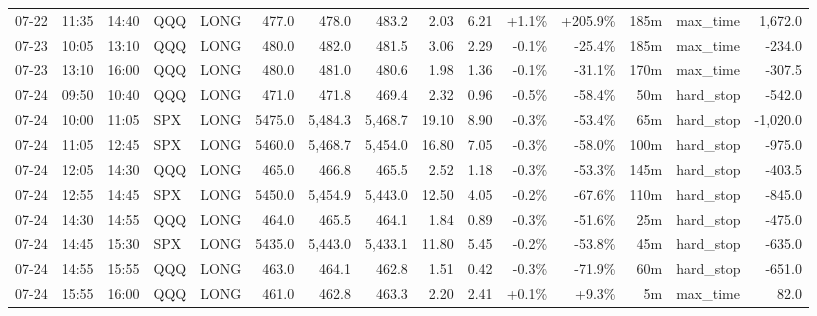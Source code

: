 \documentclass[11pt,a4paper,twoside]{article}
\begin{document}
\begin{landscape}
\begin{center}
\begin{longtable}{>{\color{txtmain}}l l l l l r r r r r r r r >{\color{txtmain}}l r}
07-22 & 11:35 & 14:40 & QQQ & LONG & 477.0 & 478.0 & 483.2 & 2.03 & 6.21 & \textcolor{wingreen}{+1.1\%} & \textcolor{wingreen}{+205.9\%} & 185m & max\_time & \textcolor{wingreen}{1,672.0} \\
07-23 & 10:05 & 13:10 & QQQ & LONG & 480.0 & 482.0 & 481.5 & 3.06 & 2.29 & \textcolor{lossred}{-0.1\%} & \textcolor{lossred}{-25.4\%} & 185m & max\_time & \textcolor{lossred}{-234.0} \\
07-23 & 13:10 & 16:00 & QQQ & LONG & 480.0 & 481.0 & 480.6 & 1.98 & 1.36 & \textcolor{lossred}{-0.1\%} & \textcolor{lossred}{-31.1\%} & 170m & max\_time & \textcolor{lossred}{-307.5} \\
07-24 & 09:50 & 10:40 & QQQ & LONG & 471.0 & 471.8 & 469.4 & 2.32 & 0.96 & \textcolor{lossred}{-0.5\%} & \textcolor{lossred}{-58.4\%} & 50m & hard\_stop & \textcolor{lossred}{-542.0} \\
07-24 & 10:00 & 11:05 & SPX & LONG & 5475.0 & 5,484.3 & 5,468.7 & 19.10 & 8.90 & \textcolor{lossred}{-0.3\%} & \textcolor{lossred}{-53.4\%} & 65m & hard\_stop & \textcolor{lossred}{-1,020.0} \\
07-24 & 11:05 & 12:45 & SPX & LONG & 5460.0 & 5,468.7 & 5,454.0 & 16.80 & 7.05 & \textcolor{lossred}{-0.3\%} & \textcolor{lossred}{-58.0\%} & 100m & hard\_stop & \textcolor{lossred}{-975.0} \\
07-24 & 12:05 & 14:30 & QQQ & LONG & 465.0 & 466.8 & 465.5 & 2.52 & 1.18 & \textcolor{lossred}{-0.3\%} & \textcolor{lossred}{-53.3\%} & 145m & hard\_stop & \textcolor{lossred}{-403.5} \\
07-24 & 12:55 & 14:45 & SPX & LONG & 5450.0 & 5,454.9 & 5,443.0 & 12.50 & 4.05 & \textcolor{lossred}{-0.2\%} & \textcolor{lossred}{-67.6\%} & 110m & hard\_stop & \textcolor{lossred}{-845.0} \\
07-24 & 14:30 & 14:55 & QQQ & LONG & 464.0 & 465.5 & 464.1 & 1.84 & 0.89 & \textcolor{lossred}{-0.3\%} & \textcolor{lossred}{-51.6\%} & 25m & hard\_stop & \textcolor{lossred}{-475.0} \\
07-24 & 14:45 & 15:30 & SPX & LONG & 5435.0 & 5,443.0 & 5,433.1 & 11.80 & 5.45 & \textcolor{lossred}{-0.2\%} & \textcolor{lossred}{-53.8\%} & 45m & hard\_stop & \textcolor{lossred}{-635.0} \\
07-24 & 14:55 & 15:55 & QQQ & LONG & 463.0 & 464.1 & 462.8 & 1.51 & 0.42 & \textcolor{lossred}{-0.3\%} & \textcolor{lossred}{-71.9\%} & 60m & hard\_stop & \textcolor{lossred}{-651.0} \\
07-24 & 15:55 & 16:00 & QQQ & LONG & 461.0 & 462.8 & 463.3 & 2.20 & 2.41 & \textcolor{wingreen}{+0.1\%} & \textcolor{wingreen}{+9.3\%} & 5m & max\_time & \textcolor{wingreen}{82.0} \\

\end{longtable}
\end{center}
\end{landscape}
\end{document}
